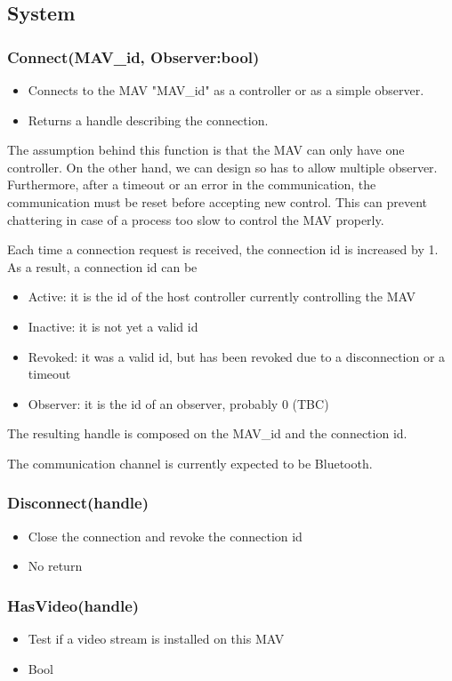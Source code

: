 \documentclass{article}
\begin{document}
\subsection{System}
\subsubsection{Connect(MAV\_id, Observer:bool)}
\begin{itemize}
\item Connects to the MAV "MAV\_id" as a controller or as a simple observer.
\item Returns a handle describing the connection. 
\end{itemize}
The assumption behind this function is that the MAV can only have one
controller. On the other hand, we can design so has to allow multiple observer.
Furthermore, after a timeout or an error in the communication, the
communication must be reset before accepting new control. This can prevent
chattering in case of a process too slow to control the MAV properly. 

Each time a connection request is received, the connection id is increased by
1. As a result, a connection id can be 
\begin{itemize}
\item Active: it is the id of the host controller currently controlling the MAV
\item Inactive: it is not yet a valid id
\item Revoked: it was a valid id, but has been revoked due to a disconnection
or a timeout
\item Observer: it is the id of an observer, probably 0 (TBC)
\end{itemize}

The resulting handle is composed on the MAV\_id and the connection id.

The communication channel is currently expected to be Bluetooth.

\subsubsection{Disconnect(handle)}
\begin{itemize}
\item Close the connection and revoke the connection id
\item No return
\end{itemize}

\subsubsection{HasVideo(handle)}
\begin{itemize}
\item Test if a video stream is installed on this MAV
\item Bool
\end{itemize}
\end{document}
